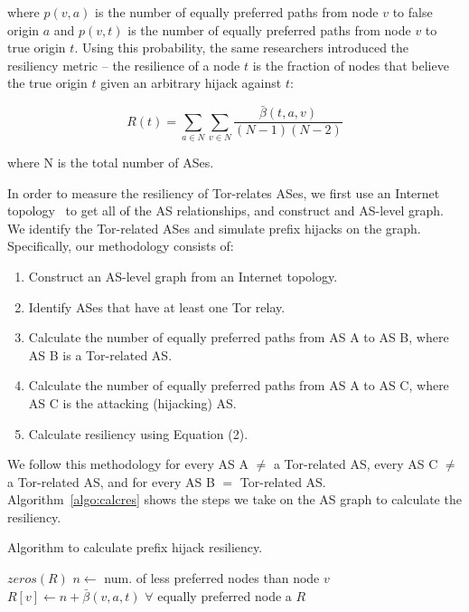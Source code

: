 where $p(v,a)$ is the number of equally preferred paths from node $v$ to false origin $a$ and $p(v,t)$ is the number of equally preferred paths from node $v$ to true origin $t$.  Using this probability, the same researchers introduced the resiliency metric -- the resilience of a node $t$ is the fraction of nodes that believe the true origin $t$ given an arbitrary  hijack against $t$:

\begin{equation}
R(t) = \sum_{a \in N} \sum_{v \in N} \frac {\bar{\beta}(t,a,v)} {(N-1)(N-2)}
\end{equation}

where N is the total number of ASes.

In order to measure the resiliency of Tor-relates ASes, we first use an Internet topology~\cite{caida} to get all of the AS relationships, and construct and AS-level graph.  We identify the Tor-related ASes and simulate prefix hijacks on the graph. Specifically, our methodology consists of:

\begin{enumerate}
\item Construct an AS-level graph from an Internet topology.
\item Identify ASes that have at least one Tor relay.
\item Calculate the number of equally preferred paths from AS A to AS B, where AS B is a Tor-related AS.
\item Calculate the number of equally preferred paths from AS A to AS C, where AS C is the attacking (hijacking) AS.
\item Calculate resiliency using Equation (2).
\end{enumerate}

We follow this methodology for every AS A $\neq$ a Tor-related AS, every AS C $\neq$ a Tor-related AS, and for every AS B $=$ Tor-related AS.  Algorithm~\ref{algo:calcres} shows the steps we take on the AS graph to calculate the resiliency.

\begin{algorithm}
\caption{Algorithm to calculate prefix hijack resiliency.}
\label{algo:calcres}
\begin{algorithmic}
    \State {}
    \State $zeros(R)$
		\State $n \gets $ num. of less preferred nodes than node $v$
		\State $R[v] \gets n + \bar{\beta}(v,a,t)$ $\forall$ equally preferred node a
	\EndIf
    \EndFor
    \State \Return $R$
\EndFunction
\end{algorithmic}
\end{algorithm}

